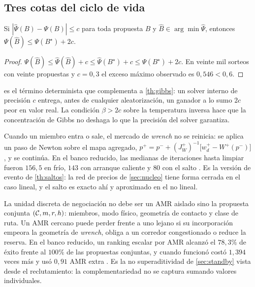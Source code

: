\subsection{Tres cotas del ciclo de vida}

\begin{lema}
\label{le:valoracion-2c}
Si $|\hat\Psi(B)-\Psi(B)|\le c$ para toda propuesta $B$ y
$\hat B\in\arg\min\hat\Psi$, entonces $\Psi(\hat B)\le\Psi(B^\star)+2c$.
\end{lema}

\begin{proof}
$\Psi(\hat B)\le\hat\Psi(\hat B)+c\le\hat\Psi(B^\star)+c\le\Psi(B^\star)+2c$.
En veinte mil sorteos con veinte propuestas y $c=0{,}3$ el exceso máximo
observado es $0{,}546<0{,}6$.
\end{proof}

\begin{observacion}
\label{obs:valoracion-gibbs}
 es el término determinista que complementa a
\cref{th:gibbs}: un solver interno de precisión $c$ entrega, antes de
cualquier aleatorización, un ganador a lo sumo $2c$ peor en valor real. La
condición $\beta>2c$ sobre la temperatura inversa hace que la concentración
de Gibbs no deshaga lo que la precisión del solver garantiza.
\end{observacion}

\begin{observacion}
\label{obs:salto-precio}
Cuando un miembro entra o sale, el mercado de \emph{wrench} no se reinicia: se
aplica un paso de Newton sobre el mapa agregado,
$p^{+}=p^{-}+(J_W^{+})^{-1}\bigl[w_d^{+}-W^{+}(p^{-})\bigr]$, y se continúa. En
el banco reducido, las medianas de iteraciones hasta limpiar fueron $156{,}5$
en frío, $143$ con arranque caliente y $80$ con el salto
\cite{mayorga2026compendio}. Es la versión de evento de \cref{th:saltos}: la
red de precios de \cref{sec:nucleo} tiene forma cerrada en el caso lineal, y
el salto es exacto ahí y aproximado en el no lineal.
\end{observacion}

\begin{observacion}
\label{obs:bundles}
La unidad discreta de negociación no debe ser un AMR aislado sino la propuesta
conjunta $(\mathcal{C},m,r,h)$: miembros, modo físico, geometría de contacto y clase
de ruta. Un AMR cercano puede perder frente a uno lejano si su incorporación
empeora la geometría de \emph{wrench}, obliga a un corredor congestionado o
reduce la reserva. En el banco reducido, un ranking escalar por AMR alcanzó el
$78{,}3\%$ de éxito frente al $100\%$ de las propuestas conjuntas, y cuando
funcionó costó $1{,}394$ veces más y usó $0{,}91$ AMR extra
\cite{mayorga2026compendio}. Es la no superaditividad de \cref{sec:standby}
vista desde el reclutamiento: la complementariedad no se captura sumando
valores individuales.
\end{observacion}
